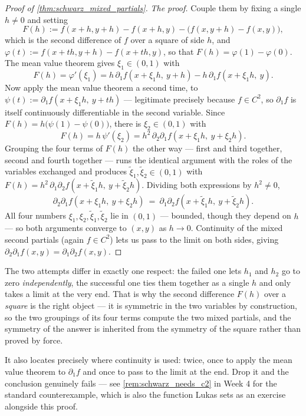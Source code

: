 \begin{proof}[Proof of \cref{thm:schwarz_mixed_partials}]
\textit{The proof.} Couple them by fixing a single $h \neq 0$ and setting
\[F(h) := f(x+h,y+h) - f(x+h,y) - \big(f(x,y+h) - f(x,y)\big),\]
which is the second difference of $f$ over a square of side $h$, and
$\varphi(t) := f(x+th, y+h) - f(x+th, y)$, so that $F(h) = \varphi(1)-\varphi(0)$. The mean
value theorem gives $\xi_1 \in (0,1)$ with
\[F(h) = \varphi'(\xi_1) = h\,\partial_1f(x+\xi_1h,\ y+h) - h\,\partial_1f(x+\xi_1h,\ y).\]
Now apply the mean value theorem a second time, to $\psi(t) := \partial_1f(x+\xi_1h,\ y+th)$ ---
legitimate precisely because $f \in C^2$, so $\partial_1 f$ is itself continuously
differentiable in the second variable. Since $F(h) = h\big(\psi(1)-\psi(0)\big)$, there is
$\xi_2 \in (0,1)$ with
\[F(h) = h\,\psi'(\xi_2) = h^2\,\partial_2\partial_1f(x+\xi_1h,\ y+\xi_2h).\]
Grouping the four terms of $F(h)$ the other way --- first and third together, second and fourth
together --- runs the identical argument with the roles of the variables exchanged and produces
$\tilde\xi_1,\tilde\xi_2 \in (0,1)$ with
$F(h) = h^2\,\partial_1\partial_2f(x+\tilde\xi_1h,\ y+\tilde\xi_2h)$. Dividing both expressions
by $h^2 \neq 0$,
\[\partial_2\partial_1f(x+\xi_1h,\ y+\xi_2h)
  \ =\ \partial_1\partial_2f(x+\tilde\xi_1h,\ y+\tilde\xi_2h).\]
All four numbers $\xi_1,\xi_2,\tilde\xi_1,\tilde\xi_2$ lie in $(0,1)$ --- bounded, though they
depend on $h$ --- so both arguments converge to $(x,y)$ as $h \to 0$. Continuity of the mixed
second partials (again $f \in C^2$) lets us pass to the limit on both sides, giving
$\partial_2\partial_1f(x,y) = \partial_1\partial_2f(x,y)$.
\end{proof}

\begin{remark}
\label{rem:why_schwarz_needs_care}
The two attempts differ in exactly one respect: the failed one lets $h_1$ and $h_2$ go to zero
\emph{independently}, the successful one ties them together as a single $h$ and only takes a
limit at the very end. That is why the second difference $F(h)$ over a \emph{square} is the
right object --- it is symmetric in the two variables by construction, so the two groupings of
its four terms compute the two mixed partials, and the symmetry of the answer is inherited from
the symmetry of the square rather than proved by force.

It also locates precisely where continuity is used: twice, once to apply the mean value theorem
to $\partial_1f$ and once to pass to the limit at the end. Drop it and the conclusion genuinely
fails --- see \cref{rem:schwarz_needs_c2} in Week 4 for the standard counterexample, which is
also the function Lukas sets as an exercise alongside this proof.
\end{remark}

